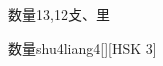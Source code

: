 \begin{entry}{数量}{13,12}{⽁、⾥}
  \begin{phonetics}{数量}{shu4liang4}[][HSK 3]
  \end{phonetics}
\end{entry}
